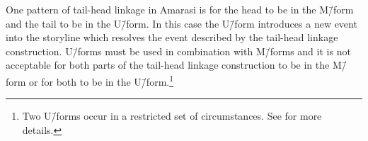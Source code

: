 \begin{exe}
\end{exe}

One pattern of tail-head linkage in Amarasi is for the head to be in the M\=/form
and the tail to be in the U\=/form.
In this case the U\=/form introduces a new event into the storyline
which resolves the event described by the tail-head linkage construction.
U\=/forms must be used in combination with M\=/forms and it is not acceptable
for both parts of the tail-head linkage construction to be in the M\=/form
or for both to be in the U\=/form.\footnote{
		Two U\=/forms occur in a restricted set of circumstances.
		See  for more details.}

